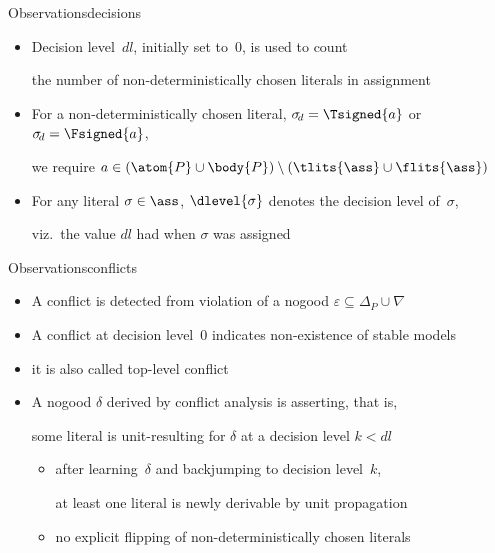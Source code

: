 \begin{frame}[shrink=20]%

\end{frame}
\begin{frame}{Observations}{decisions}
  \bigskip
  \begin{itemize}
  \item Decision level~$\mathit{dl}$, initially set to~$0$, is used to count
    \par
    the number of non-deterministically chosen literals in assignment~\ass
    \smallskip
  \item For a non-deterministically chosen literal,
    $\sigma_{\!d}=\Tsigned{a}$ or $\sigma_{\!d}=\Fsigned{a}$,
    \par
    we require $a\in(\atom{P}\cup\body{P})\setminus(\tlits{\ass}\cup\flits{\ass})$
    \smallskip
  \item For any literal $\sigma\in\ass$,
    $\dlevel{\sigma}$ denotes the decision level of~$\sigma$,
    \par
    viz.\ the value $\mathit{dl}$ had when $\sigma$ was assigned
  \end{itemize}
\end{frame}
\begin{frame}{Observations}{conflicts}
  \bigskip
  \begin{itemize}
  \item A conflict is detected from violation of a nogood $\varepsilon\subseteq\Delta_P\cup\nabla$
    \smallskip
  \item A conflict at decision level~$0$%
    indicates non-existence of stable models
  \item<3->[] it is also called \alert<3>{top-level conflict}
    \bigskip
  \item<4-> A nogood $\delta$ derived by conflict analysis is
    \alert{asserting}, that is,
    \par
    some literal is unit-resulting for $\delta$ at a decision level $k<\mathit{dl}$
    \begin{itemize}\normalsize
    \item<5-> after learning~$\delta$ and backjumping to decision level~$k$,

      at least one literal is newly derivable by unit propagation
      \smallskip
    \item<6-> no explicit flipping of non-deterministically chosen literals
    \end{itemize}
  \end{itemize}
\end{frame}
